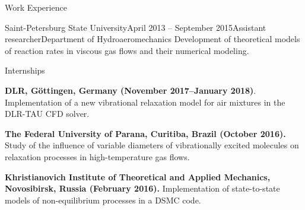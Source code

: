 \documentclass{resume} %
\begin{document}
\begin{rSection}{Work Experience}
\begin{rSubsection}{Saint-Petersburg State University}{April 2013 -- September 2015}{Assistant researcher}{Department of Hydroaeromechanics}
Development of theoretical models of reaction rates in viscous gas flows and their numerical modeling.
\end{rSubsection}



\begin{rSubsection}{Internships}{}{}{}
\item \textbf{DLR, G\"{o}ttingen, Germany (November 2017--January 2018)}.
Implementation of a new  vibrational relaxation model for air mixtures in the DLR-TAU CFD solver.

\item \textbf{The Federal University of Parana, Curitiba, Brazil (October 2016).}
Study of the influence of variable diameters of vibrationally excited molecules on relaxation processes in high-temperature gas flows.

\item \textbf{Khristianovich Institute of Theoretical and Applied Mechanics, Novosibirsk, Russia (February 2016).}
Implementation of state-to-state models of non-equilibrium processes in a DSMC code.
\end{rSubsection}
\end{rSection}
\newpage
\end{document}
